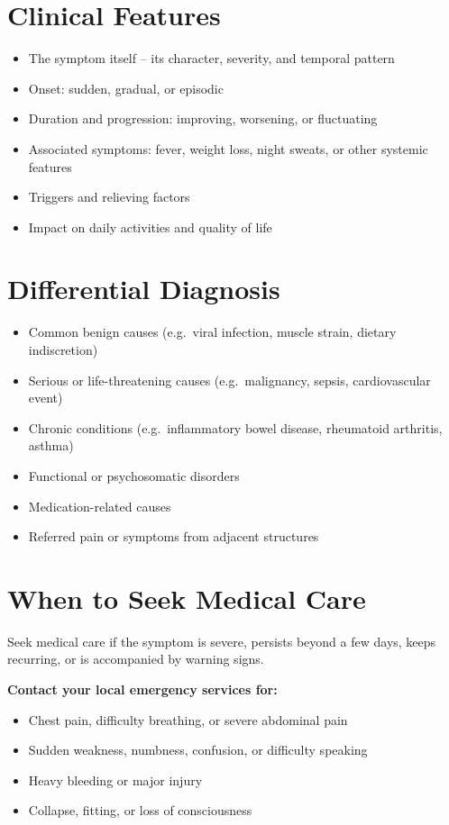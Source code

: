 \section*{Clinical Features}
\begin{itemize}
    \item The symptom itself -- its character, severity, and temporal pattern
    \item Onset: sudden, gradual, or episodic
    \item Duration and progression: improving, worsening, or fluctuating
    \item Associated symptoms: fever, weight loss, night sweats, or other systemic features
    \item Triggers and relieving factors
    \item Impact on daily activities and quality of life
\end{itemize}

\section*{Differential Diagnosis}
\begin{itemize}
    \item Common benign causes (e.g.\ viral infection, muscle strain, dietary indiscretion)
    \item Serious or life-threatening causes (e.g.\ malignancy, sepsis, cardiovascular event)
    \item Chronic conditions (e.g.\ inflammatory bowel disease, rheumatoid arthritis, asthma)
    \item Functional or psychosomatic disorders
    \item Medication-related causes
    \item Referred pain or symptoms from adjacent structures
\end{itemize}

\section*{When to Seek Medical Care}
Seek medical care if the symptom is severe, persists beyond a few days, keeps recurring, or is accompanied by warning signs.

\textbf{Contact your local emergency services for:}
\begin{itemize}
    \item Chest pain, difficulty breathing, or severe abdominal pain
    \item Sudden weakness, numbness, confusion, or difficulty speaking
    \item Heavy bleeding or major injury
    \item Collapse, fitting, or loss of consciousness
\end{itemize}

